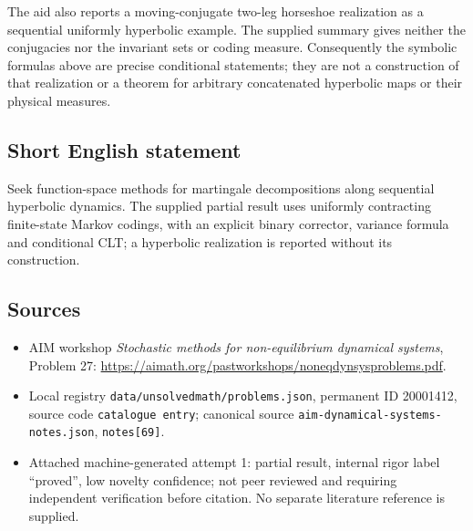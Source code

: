 \documentclass[11pt]{article}
\begin{document}
The aid also reports a moving-conjugate two-leg horseshoe realization as a sequential uniformly hyperbolic example. The supplied summary gives neither the conjugacies nor the invariant sets or coding measure. Consequently the symbolic formulas above are precise conditional statements; they are not a construction of that realization or a theorem for arbitrary concatenated hyperbolic maps or their physical measures.
\subsection{Short English statement}
Seek function-space methods for martingale decompositions along sequential hyperbolic dynamics. The supplied partial result uses uniformly contracting finite-state Markov codings, with an explicit binary corrector, variance formula and conditional CLT; a hyperbolic realization is reported without its construction.
\subsection{Sources}
\begin{itemize}
\item AIM workshop \emph{Stochastic methods for non-equilibrium dynamical systems}, Problem 27: \url{https://aimath.org/pastworkshops/noneqdynsysproblems.pdf}.
\item Local registry \texttt{data/unsolvedmath/problems.json}, permanent ID 20001412, source code \texttt{catalogue entry}; canonical source \texttt{aim-dynamical-systems-notes.json}, \texttt{notes[69]}.
\item Attached machine-generated attempt 1: partial result, internal rigor label ``proved'', low novelty confidence; not peer reviewed and requiring independent verification before citation. No separate literature reference is supplied.
\end{itemize}
\end{document}
